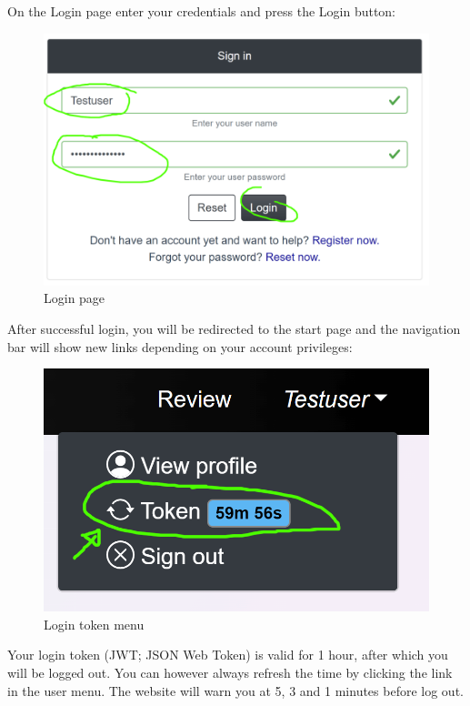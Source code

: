 \documentclass[
]{article}
\begin{document}
On the Login page enter your credentials and press the Login button:

\begin{figure}
\centering
\includegraphics{./static/img/sysndd_login_page.png}
\caption{Login page}
\end{figure}

After successful login, you will be redirected to the start page and the navigation bar will show new links depending on your account privileges:

\begin{figure}
\centering
\includegraphics{./static/img/sysndd_refresh_token.png}
\caption{Login token menu}
\end{figure}

Your login token (JWT; JSON Web Token) is valid for 1 hour, after which you will be logged out. You can however always refresh the time by clicking the link in the user menu. The website will warn you at 5, 3 and 1 minutes before log out.
\end{document}
